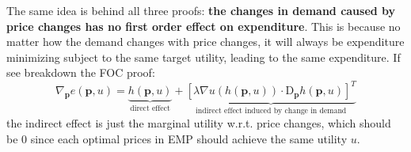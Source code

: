 The same idea is behind all three proofs: \textbf{the changes in demand caused by price changes has no first order effect on expenditure}. This is because no matter how the demand changes with price changes, it will always be expenditure minimizing subject to the same target utility, leading to the same expenditure.
If see breakdown the FOC proof:
$$ \nabla_{\mathbf{p}}e(\mathbf{p},u) = \underbrace{h(\mathbf{p},u)}_{\text{direct effect}} + \underbrace{\left[\lambda\nabla u(h(\mathbf{p},u))\cdot \mathrm{D}_{\mathbf{p}}h(\mathbf{p},u)\right]^T}_{\text{indirect effect induced by change in demand}}$$
the indirect effect is just the marginal utility w.r.t. price changes, which should be 0 since each optimal prices in EMP should achieve the same utility $u$.